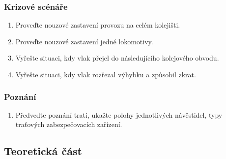 \documentclass[12pt,a4paper]{article}
\begin{document}
\subsubsection*{Krizové scénáře}
\begin{enumerate}[leftmargin=*]
\item Proveďte nouzové zastavení provozu na celém kolejišti.
\item Proveďte nouzové zastavení jedné lokomotivy.
\item Vyřešte situaci, kdy vlak přejel do následujícího kolejového obvodu.
\item Vyřešte situaci, kdy vlak rozřezal výhybku a způsobil zkrat.
\end{enumerate}

\subsubsection*{Poznání}
\begin{enumerate}[leftmargin=*]
\item Předveďte poznání trati, ukažte polohy jednotlivých návěstidel, typy
traťových zabezpečovacích zařízení.
\end{enumerate}


\subsection{Teoretická část}
\end{document}
